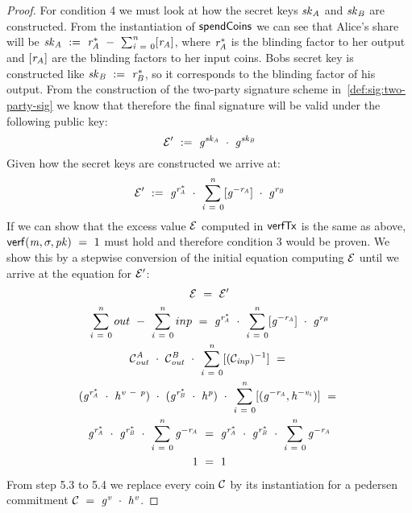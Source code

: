 \begin{proof}
    For condition 4 we must look at how the secret keys $\mathit{sk}_{\mathit{A}}$ and $\mathit{sk}_{\mathit{B}}$ are constructed.
    From the instantiation of $\mathsf{spendCoins}$ we can see that Alice's share will be $\mathit{sk}_{\mathit{A}} ~:=~ \mathit{r}_{\mathit{A}}^* ~-~ \sum_{\mathit{i} ~=~ 0}^{\mathit{n}} [\mathit{r}_{\mathit{A}}]$, where $\mathit{r}_{\mathit{A}}^*$ is the blinding factor to her output and $[\mathit{r}_{\mathit{A}}]$ are the blinding factors to her input coins.
    Bobs secret key is constructed like $\mathit{sk}_{\mathit{B}} ~:=~ \mathit{r}_{\mathit{B}}^*$, so it corresponds to the blinding factor of his output.
    From the construction of the two-party signature scheme in~\ref{def:sig:two-party-sig} we know that therefore the final signature will be valid under the following public key:
    \[ {\mathcal{E}}' ~:=~ \mathit{g}^{\mathit{sk}_{\mathit{A}}} ~\cdot~ \mathit{g}^{\mathit{sk}_{\mathit{B}}} \]
    Given how the secret keys are constructed we arrive at:
    \[ {\mathcal{E}}' ~:=~ \mathit{g}^{\mathit{r}_{\mathit{A}}^*} ~\cdot~ \sum_{\mathit{i} ~=~ 0}^{\mathit{n}} [\mathit{g}^{- \mathit{r}_{\mathit{A}}}] ~\cdot~ \mathit{g}^{\mathit{r}_{\mathit{B}}} \]
    If we can show that the excess value $\mathcal{E}$ computed in $\mathsf{verfTx}$ is the same as above, $\mathsf{verf}(\mathit{m}, \sigma, \mathit{pk}) ~=~ 1$ must hold and therefore condition 3 would be proven.
    We show this by a stepwise conversion of the initial equation computing $\mathcal{E}$ until we arrive at the equation for ${\mathcal{E}}'$:
    \begin{gather}
        \mathcal{E} ~=~ {\mathcal{E}}' \\
        \sum_{\mathit{i} ~=~ 0}^{\mathit{n}} out ~-~ \sum_{\mathit{i} ~=~ 0}^{\mathit{n}} inp ~=~ \mathit{g}^{\mathit{r}_{\mathit{A}}^*} ~\cdot~ \sum_{\mathit{i} ~=~ 0}^{\mathit{n}} [\mathit{g}^{- \mathit{r}_{\mathit{A}}}] ~\cdot~ \mathit{g}^{\mathit{r}_{\mathit{B}}} \\
        \mathcal{C}_{\mathit{out}}^{\mathit{A}} ~\cdot~ \mathcal{C}_{\mathit{out}}^{\mathit{B}} ~\cdot~ \sum_{\mathit{i} ~=~ 0}^{\mathit{n}} [(\mathcal{C}_{\mathit{inp}})^{-1}]  ~=~\\
        (\mathit{g}^{\mathit{r}_{\mathit{A}}^*} ~\cdot~ \mathit{h}^{\mathit{v} ~-~ \mathit{p}}) ~\cdot~
        (\mathit{g}^{\mathit{r}_{\mathit{B}}^*} ~\cdot~ \mathit{h}^{\mathit{p}}) ~\cdot~
        \sum_{\mathit{i} ~=~ 0}^{\mathit{n}} [(\mathit{g}^{- \mathit{r}_{\mathit{A}}}, \mathit{h}^{- \mathit{v}_i})] ~=~ \\
        \mathit{g}^{\mathit{r}_{\mathit{A}}^*} ~\cdot~ \mathit{g}^{\mathit{r}_{\mathit{B}}^*} ~\cdot~ \sum_{\mathit{i} ~=~ 0}^{\mathit{n}} \mathit{g}^{- \mathit{r}_{\mathit{A}}} ~=~ \mathit{g}^{\mathit{r}_{\mathit{A}}^*} ~\cdot~ \mathit{g}^{\mathit{r}_{\mathit{B}}^*} ~\cdot~ \sum_{\mathit{i} ~=~ 0}^{\mathit{n}} \mathit{g}^{- \mathit{r}_{\mathit{A}}} \\
        1 ~=~ 1
    \end{gather}
    From step 5.3 to 5.4 we replace every coin $\mathcal{C}$ by its instantiation for a pedersen commitment $\mathcal{C} ~=~ \mathit{g}^{\mathit{v}} ~\cdot~ \mathit{h}^{\mathit{v}}$.


\end{proof}
